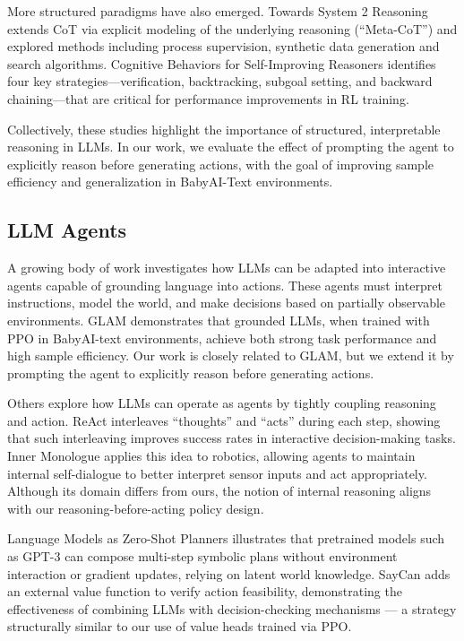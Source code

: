 \documentclass[11pt,a4paper]{article}
\begin{document}
More structured paradigms have also emerged. Towards System 2 Reasoning \cite{xiang2025towards} extends CoT via explicit modeling of the underlying reasoning (``Meta-CoT'') and explored methods including process supervision, synthetic data generation and search algorithms. Cognitive Behaviors for Self-Improving Reasoners \cite{gandhi2025cognitive} identifies four key strategies—verification, backtracking, subgoal setting, and backward chaining—that are critical for performance improvements in RL training. 

Collectively, these studies highlight the importance of structured, interpretable reasoning in LLMs. In our work, we evaluate the effect of prompting the agent to explicitly reason before generating actions, with the goal of improving sample efficiency and generalization in BabyAI-Text environments.

\subsection{LLM Agents}

A growing body of work investigates how LLMs can be adapted into interactive agents capable of grounding language into actions. These agents must interpret instructions, model the world, and make decisions based on partially observable environments. GLAM \cite{carta2023grounding} demonstrates that grounded LLMs, when trained with PPO in BabyAI-text environments, achieve both strong task performance and high sample efficiency. Our work is closely related to GLAM, but we extend it by prompting the agent to explicitly reason before generating actions.

Others explore how LLMs can operate as agents by tightly coupling reasoning and action. ReAct \cite{yao2023react} interleaves ``thoughts'' and ``acts'' during each step, showing that such interleaving improves success rates in interactive decision-making tasks. Inner Monologue \cite{huang2022inner} applies this idea to robotics, allowing agents to maintain internal self-dialogue to better interpret sensor inputs and act appropriately. Although its domain differs from ours, the notion of internal reasoning aligns with our reasoning-before-acting policy design.

Language Models as Zero-Shot Planners \cite{huang2022language} illustrates that pretrained models such as GPT-3 can compose multi-step symbolic plans without environment interaction or gradient updates, relying on latent world knowledge. SayCan \cite{ahn2022can} adds an external value function to verify action feasibility, demonstrating the effectiveness of combining LLMs with decision-checking mechanisms — a strategy structurally similar to our use of value heads trained via PPO.
\end{document}
